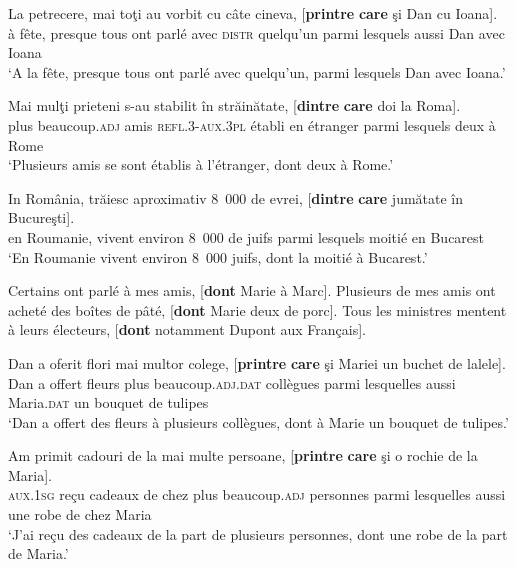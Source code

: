 \ea \label{ch3:ex37} 
\ea 
\gll La  petrecere,  mai  toţi  au  vorbit  cu  câte  cineva,  [\textbf{printre} \textbf{care} şi  Dan  cu  Ioana]. \label{ch3:ex37a}\\
à  fête,  presque  tous  ont  parlé  avec  \textsc{distr}  quelqu’un  parmi  lesquels aussi  Dan  avec  Ioana\\
\glt ‘A la fête, presque tous ont parlé avec quelqu’un, parmi lesquels Dan avec Ioana.’

\ex 
\gll Mai  mulţi  prieteni  s-au  stabilit  în  străinătate,  [\textbf{dintre}  \textbf{care}  doi  la  Roma]. \label{ch3:ex37b}\\
plus  beaucoup.\textsc{adj}  amis  \textsc{refl.3-aux.3pl}  établi  en  étranger  parmi 
lesquels  deux  à  Rome \\
\glt ‘Plusieurs amis se sont établis à l’étranger, dont deux à Rome.’

\ex 
\gll In  România,  trăiesc  aproximativ  8~000  de  evrei,  [\textbf{dintre} \textbf{care}  jumătate în  Bucureşti]. \label{ch3:ex37c}\\
en  Roumanie,  vivent  environ  8~000  de  juifs  parmi  lesquels  moitié en  Bucarest \\
\glt ‘En Roumanie vivent environ 8~000 juifs, dont la moitié à Bucarest.’
\z 
\z 


\ea \label{ch3:ex38} 
\ea 
Certains ont parlé à mes amis, [\textbf{dont} Marie à Marc]. \label{ch3:ex38a}
\ex 
Plusieurs de mes amis ont acheté des boîtes de pâté, [\textbf{dont} Marie deux de porc]. \label{ch3:ex38b}
\ex 
Tous les ministres mentent à leurs électeurs, [\textbf{dont} notamment Dupont aux Français]. \label{ch3:ex38c} 
\z 
\z 


\ea \label{ch3:ex39}
\ea 
\gll Dan  a  oferit  flori  mai  multor  colege,  [\textbf{printre} \textbf{care} şi Mariei  un  buchet  de  lalele]. \label{ch3:ex39a}\\
Dan  a  offert  fleurs  plus  beaucoup.\textsc{adj.dat}  collègues  parmi  lesquelles  aussi Maria.\textsc{dat}  un  bouquet  de  tulipes \\
\glt ‘Dan a offert des fleurs à plusieurs collègues, dont à Marie un bouquet de tulipes.’ 

\ex 
\gll Am  primit  cadouri  de  la  mai  multe  persoane,  [\textbf{printre} \textbf{care}  şi  o  rochie  de  la  Maria]. \label{ch3:ex39b}\\
 \textsc{aux.1sg}  reçu  cadeaux  de  chez  plus  beaucoup.\textsc{adj}  personnes  parmi lesquelles  aussi  une  robe  de  chez  Maria \\
\glt ‘J’ai reçu des cadeaux de la part de plusieurs personnes, dont une robe de la part de Maria.’

